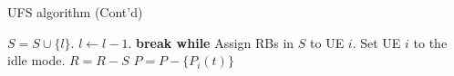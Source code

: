 \clearpage

\begin{algorithm}[H]
  \ContinuedFloat
  \caption{ UFS algorithm (Cont'd)}
  \label{alg:UFS}
  \begin{algorithmic}[1]  
    		\State $S=S\cup \lbrace l \rbrace$.
    		\State $l\leftarrow l-1$.
    	\EndIf	\label{line:op10}
    	 \label{line:op11}
    		\State \textbf{break while}
    	\EndIf	\label{line:op12}
    \EndWhile
    \State Assign RBs in $S$ to UE $i$.	\label{line:op13}
    \State Set UE $i$ to the idle mode.
    \State $R=R-S$
    \State $P=P-\lbrace P_i(t) \rbrace$	\label{line:op14}
    \EndWhile
  \end{algorithmic}
\end{algorithm}